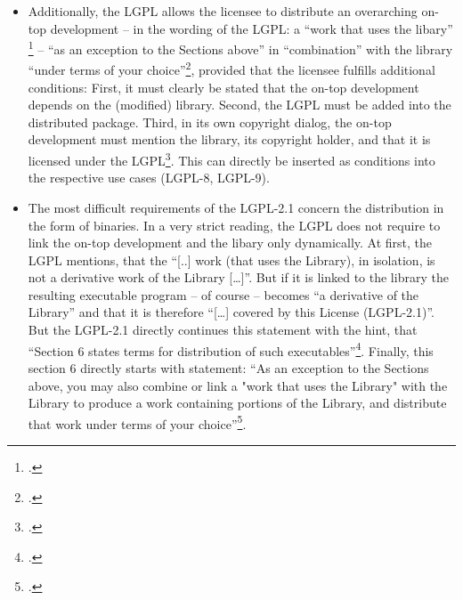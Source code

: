 \begin{itemize}
\begin{itemize}
    \item Third, the LGPL definitely requires, that \enquote{the modified work
    must itself be a software library}\footcite[cf.][\nopage wp.\
    §2]{Lgpl21OsiLicense1999a}. This conditions can directly be incorprated as
    an interdiction into all use cases which refer to the modification of a
    library [LGPL-6 - LGPL-9]. But is difficult to respect the condition if one
    wants to modify a program which one has received under the terms of the
    LGPL-2.1. Logically, you can write an application und license it under the
    LGPL. But - as a consequence - it is more difficult to modify your work
    because the result must be a library. That's the reason, why the OSLiC
    mentions the use case, but forbids its execution\footnote{as long as nobody
    has shown us an exit out of this trap.}.
  \end{itemize}
  
  \item Additionally, the LGPL allows the licensee to distribute an overarching
  on-top development -- in the wording of the LGPL: a \enquote{work that uses
  the libary} \footcite[cf.][\nopage wp.\ §5, §6]{Lgpl21OsiLicense1999a} --
  \enquote{as an exception to the Sections above} in \enquote{combination} with
  the library \enquote{under terms of your choice}\footcite[cf.][\nopage wp.\
  §6]{Lgpl21OsiLicense1999a}, provided that the licensee fulfills additional
  conditions:  First, it must clearly be stated that the on-top development
  depends on the (modified) library. Second, the LGPL must be added into the
  distributed package. Third, in its own copyright dialog, the on-top
  development must mention the library, its copyright holder, and that it is
  licensed under the LGPL\footcite[cf.][\nopage wp.\ §6]{Lgpl21OsiLicense1999a}.
  This can directly be inserted as conditions into the respective use cases
  (LGPL-8, LGPL-9). 
  
  \item The most difficult requirements of the LGPL-2.1 concern the distribution
  in the form of binaries. In a very strict reading, the LGPL does not require
  to link the on-top development and the libary only dynamically. At first, the
  LGPL mentions, that the \enquote{[..] work (that uses the Library), in
  isolation, is not a derivative work of the Library [\ldots]}. But if it is
  linked to the library the resulting executable program -- of course -- becomes
  \enquote{a derivative of the Library} and that it is therefore
  \enquote{[\ldots] covered by this License (LGPL-2.1)}. But the LGPL-2.1
  directly continues this statement with the hint, that \enquote{Section 6
  states terms for distribution of such executables}\footcite[cf.][\nopage wp.\
  §5]{Lgpl21OsiLicense1999a}. Finally, this section 6 directly starts with
  statement: \enquote{As an exception to the Sections above, you may also
  combine or link a "work that uses the Library" with the Library to produce a
  work containing portions of the Library, and distribute that work under terms
  of your choice}\footcite[cf.][\nopage wp.\ §6]{Lgpl21OsiLicense1999a}.
  

\end{itemize}
